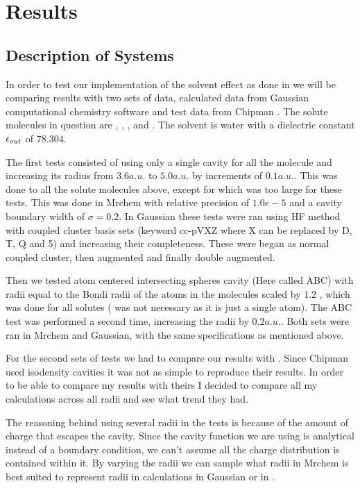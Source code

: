 \documentclass[../master_thesis.tex]{subfiles}
\begin{document}
\chapter{Results}
\section{Description of Systems}
In order to test our implementation of the solvent effect as done in \cite{FossoTande:2013ka}
we will be comparing results with two sets of data, calculated data from Gaussian
computational chemistry software and test data from Chipman \cite{Chipman2002}.
The solute molecules in question are , , ,
 and . The solvent is water with a dielectric constant
$\epsilon_{out}$ of $78.304$.

The first tests consisted of using only a single cavity for all the molecule and
increasing its radius from $3.6 a.u.$ to $5.0 a.u.$ by increments of $0.1 a.u.$.
This was done to all the solute molecules above, except for   which
was too large for these tests. This was done in Mrchem with relative precision of
$1.0e-5$ and a cavity boundary width of $\sigma = 0.2$. In Gaussian these tests were
ran using \ac{HF} method with coupled cluster basis sets (keyword cc-pVXZ where X
can be replaced by D, T, Q and 5) and increasing their completeness. These were
began as normal coupled cluster, then augmented and finally double augmented.

Then we tested atom centered intersecting spheres cavity (Here called \ac{ABC})
with radii equal to the Bondi radii of the atoms in the molecules \cite{doi:10.1021/j100785a001} scaled by $1.2$
\cite{Tomasi:1994wt}, which was done for all solutes ( was not necessary as it
is just a single atom). The \ac{ABC} test was performed a second time, increasing the radii by $0.2 a.u.$.
Both sets were ran in Mrchem and Gaussian, with the same specifications as mentioned above.

For the second sets of tests we had to compare our results with \cite{Chipman2002}.
Since Chipman used isodensity cavities it was not as simple to reproduce their results.
In order to be able to compare my results with theirs I decided to compare all my
calculations across all radii and see what trend they had.

The reasoning behind using several radii in the tests is because of the amount of
charge that escapes the cavity. Since the cavity function we are using is analytical
instead of a boundary condition, we can't assume all the charge distribution
is contained within it. By varying the radii we can sample what radii in Mrchem
is best suited to represent radii in calculations in Gaussian or in \cite{Chipman2002}.
\end{document}
